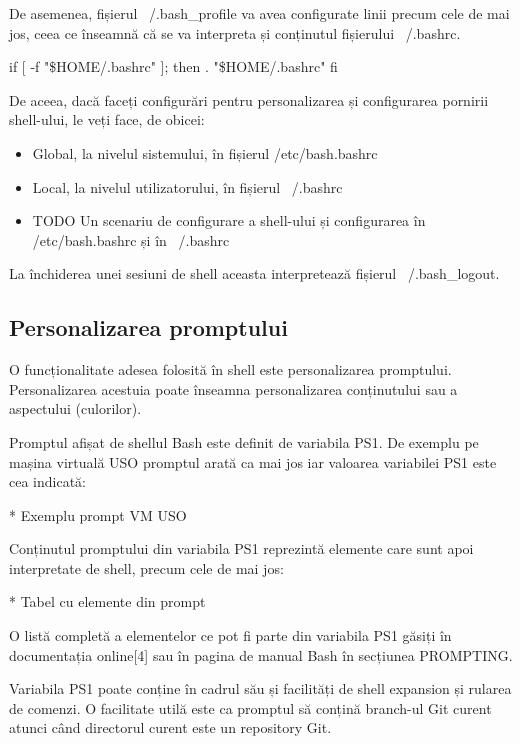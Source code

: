 De asemenea, fișierul ~/.bash_profile va avea configurate linii precum cele de
mai jos, ceea ce înseamnă că se va interpreta și conținutul fișierului
~/.bashrc.

\begin{screen}
    if [ -f "\$HOME/.bashrc" ]; then
        . "\$HOME/.bashrc"
    fi
\end{screen}

De aceea, dacă faceți configurări pentru personalizarea și configurarea pornirii
shell-ului, le veți face, de obicei:

\begin{itemize}
	\item Global, la nivelul sistemului, în fișierul /etc/bash.bashrc

	\item Local, la nivelul utilizatorului, în fișierul ~/.bashrc

	\item TODO Un scenariu de configurare a shell-ului și configurarea în
		/etc/bash.bashrc și în ~/.bashrc
\end{itemize}

La închiderea unei sesiuni de shell aceasta interpretează fișierul ~/.bash_logout.

\subsection{Personalizarea promptului}
\label{sec:cli-prompt}

O funcționalitate adesea folosită în shell este personalizarea promptului.
Personalizarea acestuia poate înseamna personalizarea conținutului sau a
aspectului (culorilor).

Promptul afișat de shellul Bash este definit de variabila PS1. De exemplu pe
mașina virtuală USO promptul arată ca mai jos iar valoarea variabilei PS1 este
cea indicată:

* Exemplu prompt VM USO

Conținutul promptului din variabila PS1 reprezintă elemente care sunt apoi
interpretate de shell, precum cele de mai jos:

* Tabel cu elemente din prompt

O listă completă a elementelor ce pot fi parte din variabila PS1 găsiți în
documentația online[4] sau în pagina de manual Bash în secțiunea PROMPTING.

Variabila PS1 poate conține în cadrul său și facilități de shell expansion și
rularea de comenzi. O facilitate utilă este ca promptul să conțină branch-ul Git
curent atunci când directorul curent este un repository Git.

